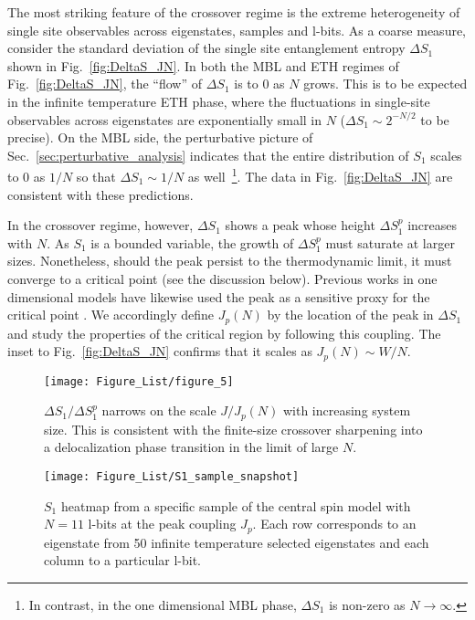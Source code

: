 \documentclass[aps,pra,twocolumn,a4paper,showpacs,superscriptaddress,floatfix,10pt]{revtex4}
\begin{document}
The most striking feature of the crossover regime is the extreme heterogeneity of single site observables across eigenstates, samples and l-bits.
As a coarse measure, consider the standard deviation of the single site entanglement entropy $\Delta S_1$ shown in Fig.~\ref{fig:DeltaS_JN}.
In both the MBL and ETH regimes of Fig.~\ref{fig:DeltaS_JN}, the ``flow'' of $\Delta S_1$ is to 0 as $N$ grows.
This is to be expected in the infinite temperature ETH phase, where the fluctuations in single-site observables across eigenstates are exponentially small in $N$ ($\Delta S_1 \sim 2^{-N/2}$ to be precise).
%
On the MBL side, the perturbative picture of Sec.~\ref{sec:perturbative_analysis} indicates that the entire distribution of $S_1$ scales to $0$ as $1/N$ so that $\Delta S_1 \sim 1/N$ as well~\footnote{In contrast, in the one dimensional MBL phase, $\Delta S_1$ is non-zero as $N \to \infty$.}.
%
The data in Fig.~\ref{fig:DeltaS_JN} are consistent with these predictions.

In the crossover regime, however, $\Delta S_1$ shows a peak whose height $\Delta S_1^p$ increases with $N$.
As $S_1$ is a bounded variable, the growth of $\Delta S_1^p$ must saturate at larger sizes.
Nonetheless, should the peak persist to the thermodynamic limit, it must converge to a critical point (see the discussion below).
Previous works in one dimensional models have likewise used the peak as a sensitive proxy for the critical point \cite{Kjall:2014aa,Khemani:2016aa}.
We accordingly define $J_p(N)$ by the location of the peak in $\Delta S_1$ and study the properties of the critical region by following this coupling.
The inset to Fig.~\ref{fig:DeltaS_JN} confirms that it scales as $J_p(N) \sim W/N$.

\begin{figure}[tb]
\texttt{[image: Figure\_List/figure\_5]}
\caption{ $\Delta S_1 /\Delta S_1^{p}$ narrows on the scale $J/J_p(N)$ with increasing system size. This is consistent with the finite-size crossover sharpening into a delocalization phase transition in the limit of large $N$.}
\label{fig:Rescaled_DeltaS_Peak}
\end{figure}

\begin{figure}
\texttt{[image: Figure\_List/S1\_sample\_snapshot]}
\caption{ $S_1$ heatmap from a specific sample of the central spin model with $N=11$ l-bits at the peak coupling $J_p$. Each row corresponds to an eigenstate from 50 infinite temperature selected eigenstates and each column to a particular l-bit.}
\label{fig:Sample_S1_snapshot}
\end{figure}
\end{document}

